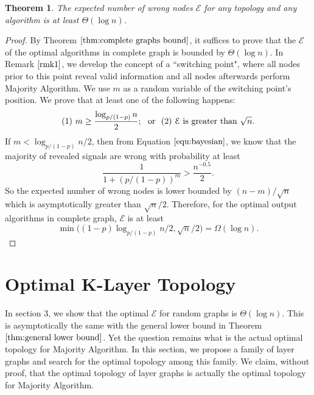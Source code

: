 \documentclass[a4paper,UKenglish]{lipics}
\newtheorem{thm}{Theorem}[section] %
\theoremstyle{definition}
\begin{document}
\begin{thm}
\label{thm:general lower bound}
The expected number of wrong nodes $\mathcal{E}$ for any topology and any algorithm is at least $\Theta(\log n)$.
\end{thm}

\begin{proof}
By Theorem $\ref{thm:complete graphs bound}$, it suffices to prove that 
	the $\mathcal{E}$ of the optimal algorithms in complete graph is bounded by $\Theta(\log n)$.
In Remark $\ref{rmk1}$, we develop the concept of a ``switching point", 
	where all nodes prior to this point reveal valid information and all nodes afterwards perform Majority Algorithm.
We use $m$ as a random variable of the switching point's position.
We prove that at least one of the following happens:
\begin{equation*}
(1)~m\geq {\log_{p/(1-p)}n \over 2}; \text{~ or ~} 
(2)~\mathcal{E} \text{ is greater than } \sqrt{n}.
\end{equation*}
If $m<\log_{p / (1-p)} n \Big/ 2$, then from Equation $\eqref{equ:bayesian}$, we know that the majority of revealed signals are wrong
	with probability at least 
\begin{equation*}
	\frac{1}{1 + (p/(1-p))^m} 
	> 
	\frac{n^{-0.5}}{2}.
\end{equation*}
So the expected number of wrong nodes is lower bounded by $ {(n-m)} / {\sqrt{n}}$ which is asymptotically greater than ${\sqrt{n}}/2$. 
Therefore, for the optimal output algorithms in complete graph, $\mathcal{E}$ is at least
\begin{equation*}
	\min \Big((1 - p) \log_{p/(1-p)}n \Big/ 2,  \sqrt{n} \Big/2 \Big) 
	= 
	\Omega(\log n).
\end{equation*}
\end{proof}









\section {Optimal K-Layer Topology}

In section 3, we show that the optimal $\mathcal{E}$ for random graphs is $\Theta(\log n)$.
This is asymptotically the same with the general lower bound in Theorem $\ref{thm:general lower bound}$.
Yet the question remains what is the actual optimal topology for Majority Algorithm.
In this section, we propose a family of layer graphs and search for the optimal topology among this family.
We claim, without proof, that the optimal topology of layer graphs is actually the optimal topology for Majority Algorithm.
\end{document}
